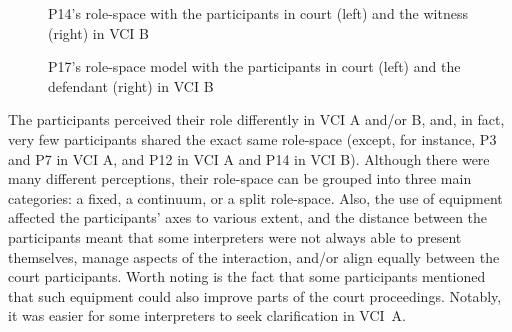 \documentclass[output=paper]{langsci/langscibook}
\begin{document}
\begin{figure}
\caption{P14's role-space with the participants in court (left) and the witness (right) in \textsc{VCI} B}
\end{figure}

\begin{figure}
   
\caption{\label{fig:devaux:15}P17's role-space model with the participants in court (left) and the defendant (right) in \textsc{VCI} B}
\end{figure}

The participants perceived their role differently in \textsc{VCI} A and/or B, and, in fact, very few participants shared the exact same role-space (except, for instance, P3 and P7 in \textsc{VCI} A, and P12 in \textsc{VCI} A and P14 in \textsc{VCI} B). Although there were many different perceptions, their role-space can be grouped into three main categories: a fixed, a continuum, or a split role-space. Also, the use of equipment affected the participants’ axes to various extent, and the distance between the participants meant that some interpreters were not always able to present themselves, manage aspects of the interaction, and/or align equally between the court participants. Worth noting is the fact that some participants mentioned that such equipment could also improve parts of the court proceedings. Notably, it was easier for some interpreters to seek clarification in \textsc{VCI}~A. 
\end{document}
